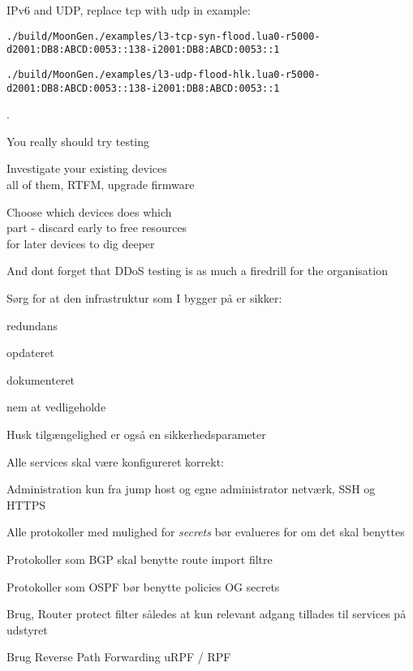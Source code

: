\documentclass[Screen16to9,17pt]{foils}
\begin{document}
IPv6 and UDP, replace tcp with udp in example:
\begin{alltt}\footnotesize
./build/MoonGen ./examples/l3-tcp-syn-flood.lua 0 -r 5000 -d 2001:DB8:ABCD:0053::138 -i 2001:DB8:ABCD:0053::1

./build/MoonGen ./examples/l3-udp-flood-hlk.lua 0 -r 5000 -d 2001:DB8:ABCD:0053::138 -i 2001:DB8:ABCD:0053::1
\end{alltt}





.
\begin{list1}
\item You really should try testing
\item Investigate your existing devices\\
all of them, RTFM, upgrade firmware
\item Choose which devices does which\\
part - discard early to free resources\\
for later devices to dig deeper
\end{list1}

\vskip 3cm
\centerline{And dont forget that DDoS testing is as much a firedrill for the organisation}



\begin{list1}
\item Sørg for at den infrastruktur som I bygger på er sikker:
\begin{list2}
 \item redundans
       \item opdateret
        \item dokumenteret
        \item nem at vedligeholde
\end{list2}

\item  Husk tilgængelighed er også en sikkerhedsparameter
\end{list1}



\begin{list1}
\item Alle services skal være konfigureret korrekt:
\begin{list2}
\item Administration kun fra jump host og egne administrator netværk, SSH og HTTPS
\item Alle protokoller med mulighed for \emph{secrets} bør evalueres for om det skal benyttes
\item Protokoller som BGP skal benytte route import filtre
\item Protokoller som OSPF bør benytte policies OG secrets
\item Brug, Router protect filter således at kun relevant adgang tillades til services på udstyret
\item Brug Reverse Path Forwarding uRPF / RPF
\end{list2}
\end{list1}
\end{document}

